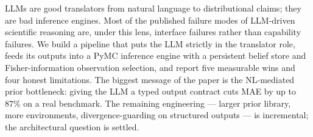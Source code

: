 \documentclass{article}
\begin{document}
LLMs are good translators from natural language to distributional
claims; they are bad inference engines. Most of the published
failure modes of LLM-driven scientific reasoning are, under this
lens, interface failures rather than capability failures. We build a
pipeline that puts the LLM strictly in the translator role, feeds its
outputs into a PyMC inference engine with a persistent belief store
and Fisher-information observation selection, and report five
measurable wins and four honest limitations. The biggest message of
the paper is the NL-mediated prior bottleneck: giving the LLM a typed
output contract cuts MAE by up to $87\%$ on a real benchmark. The
remaining engineering --- larger prior library, more environments,
divergence-guarding on structured outputs --- is incremental; the
architectural question is settled.



\end{document}
